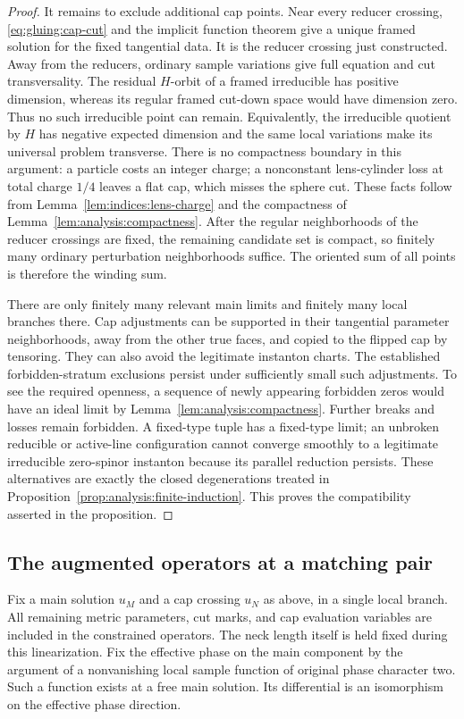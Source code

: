 \begin{proof}
It remains to exclude additional cap points.  Near every reducer
crossing, \eqref{eq:gluing:cap-cut} and the implicit function theorem
give a unique framed solution for the fixed tangential data.  It is
the reducer crossing just constructed.  Away from the reducers,
ordinary sample variations give full equation and cut transversality.
The residual $H$-orbit of a framed irreducible has positive dimension,
whereas its regular framed cut-down space would have dimension zero.
Thus no such irreducible point can remain.  Equivalently, the
irreducible quotient by $H$ has negative expected dimension and the
same local variations make its universal problem transverse.
There is no compactness boundary in this argument: a particle costs
an integer charge; a nonconstant lens-cylinder loss at total charge
$1/4$ leaves a flat cap, which misses the sphere cut.  These facts
follow from Lemma~\ref{lem:indices:lens-charge} and the compactness
of Lemma~\ref{lem:analysis:compactness}.  After the regular neighborhoods
of the reducer crossings are fixed, the remaining candidate set is
compact, so finitely many ordinary perturbation neighborhoods suffice.
The oriented sum of all points is therefore the winding sum.

There are only finitely many relevant main limits and finitely many
local branches there.  Cap adjustments can be supported in their
tangential parameter neighborhoods, away from the other true faces,
and copied to the flipped cap by tensoring.  They can also avoid
the legitimate instanton charts.  The established forbidden-stratum
exclusions persist under sufficiently small such adjustments.  To
see the required openness, a sequence of newly appearing forbidden
zeros would have an ideal limit by Lemma~\ref{lem:analysis:compactness}.
Further breaks and losses remain forbidden.  A fixed-type tuple has
a fixed-type limit; an unbroken reducible or active-line configuration
cannot converge smoothly to a legitimate irreducible zero-spinor
instanton because its parallel reduction persists.  These alternatives
are exactly the closed degenerations treated in
Proposition~\ref{prop:analysis:finite-induction}.  This proves the
compatibility asserted in the proposition.
\end{proof}

\subsection{The augmented operators at a matching pair}

Fix a main solution $u_M$ and a cap crossing $u_N$ as above, in a
single local branch.  All remaining metric parameters, cut marks,
and cap evaluation variables are included in the constrained
operators.  The neck length itself is held fixed during this
linearization.  Fix the effective phase on the main component by
the argument of a nonvanishing local sample function of original
phase character two.  Such a function exists at a free main solution.
Its differential is an isomorphism on the effective phase direction.

